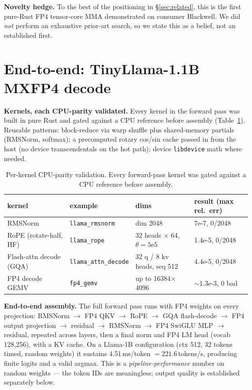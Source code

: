 \documentclass[11pt]{article}
\begin{document}
\textbf{Novelty hedge.} To the best of the positioning in \S\ref{sec:related}, this is the first pure-Rust FP4 tensor-core MMA demonstrated on consumer Blackwell. We did \emph{not} perform an exhaustive prior-art search, so we state this as a belief, not an established first.

\section{End-to-end: TinyLlama-1.1B MXFP4 decode}
\label{sec:e2e}

\textbf{Kernels, each CPU-parity validated.} Every kernel in the forward pass was built in pure Rust and gated against a CPU reference before assembly (Table~\ref{tab:kernels}). Reusable patterns: block-reduce via warp shuffle plus shared-memory partials (RMSNorm, softmax); a precomputed rotary cos/sin cache passed in from the host (no device transcendentals on the hot path); device \texttt{libdevice} math where needed.

\begin{table}[t]\centering
\begin{tabular}{llll}
\toprule
kernel & example & dims & result (max rel.\ err)\\
\midrule
RMSNorm & \texttt{llama\_rmsnorm} & dim 2048 & 7e-7, 0/2048\\
RoPE (rotate-half, HF) & \texttt{llama\_rope} & 32 heads $\times$ 64, $\theta{=}5\mathrm{e}5$ & 1.4e-5, 0/2048\\
Flash-attn decode (GQA) & \texttt{llama\_attn\_decode} & 32 q / 8 kv heads, seq 512 & 4.4e-5, 0/2048\\
FP4 decode GEMV & \texttt{fp4\_gemv} & up to 16384$\times$4096 & $\sim$1.3e-3, 0 bad\\
\bottomrule
\end{tabular}
\caption{Per-kernel CPU-parity validation. Every forward-pass kernel was gated against a CPU reference before assembly.}
\label{tab:kernels}
\end{table}

\textbf{End-to-end assembly.} The full forward pass runs with FP4 weights on every projection: RMSNorm $\rightarrow$ FP4 QKV $\rightarrow$ RoPE $\rightarrow$ GQA flash-decode $\rightarrow$ FP4 output projection $\rightarrow$ residual $\rightarrow$ RMSNorm $\rightarrow$ FP4 SwiGLU MLP $\rightarrow$ residual, repeated across layers, then a final norm and FP4 LM head (vocab 128{,}256), with a KV cache. On a Llama-1B configuration (ctx 512, 32 tokens timed, random weights) it sustains 4.51\,ms/token $= 221.6$\,tokens/s, producing finite logits and a valid argmax. This is a \emph{pipeline-performance} number on random weights --- the token IDs are meaningless; output quality is established separately below.
\end{document}
